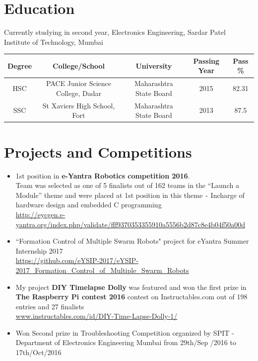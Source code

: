 \documentclass{article}
\begin{document}
	\section*{Education}
	
	Currently studying in second year, Electronics Engineering, Sardar Patel Institute of Technology, Mumbai
	\newline
	\begin{tabular}{|c|c|c|c|c|}
		\hline
		Degree & College/School & University & Passing Year & Pass \% \\
		\hline
		HSC & PACE Junior Science College, Dadar & Maharashtra State Board & 2015 & 82.31\\
		\hline
		SSC & St Xaviers High School, Fort & Maharashtra State Board  & 2013 & 87.5\\
		\hline
	\end{tabular}
	
	\section*{Projects and Competitions}
	\begin{itemize}%
		
		\item 1st position in \textbf{e-Yantra Robotics competition 2016}. \\
		Team was selected as one of 5 finalists out of 162 teams in the ``Launch a Module'' theme and were placed at 1st
		position in this theme \verb|-| Incharge of hardware design and embedded C programming\\
		\url{http://eycgen.e-yantra.org/index.php/validate/fff9370353355910a5556b2d87c8e4b04f50a00d}		
		
		\item``Formation Control of Multiple Swarm Robots" project for eYantra Summer Internship 2017\\
		\url{https://github.com/eYSIP-2017/eYSIP-2017_Formation_Control_of_Multiple_Swarm_Robots}
			
		\item My project \textbf{DIY Timelapse Dolly} was featured and won the first prize in \textbf{The Raspberry Pi contest 2016} contest on Instructables.com out of 198 entries and 27 finalists\\
		\url{www.instructables.com/id/DIY-Time-Lapse-Dolly-1/}
		
		\item Won Second prize in Troubleshooting Competition organized by SPIT - Department of Electronics Engineering Mumbai from 29th/Sep /2016 to 17th/Oct/2016			
	\end{itemize}
	
\end{document}
